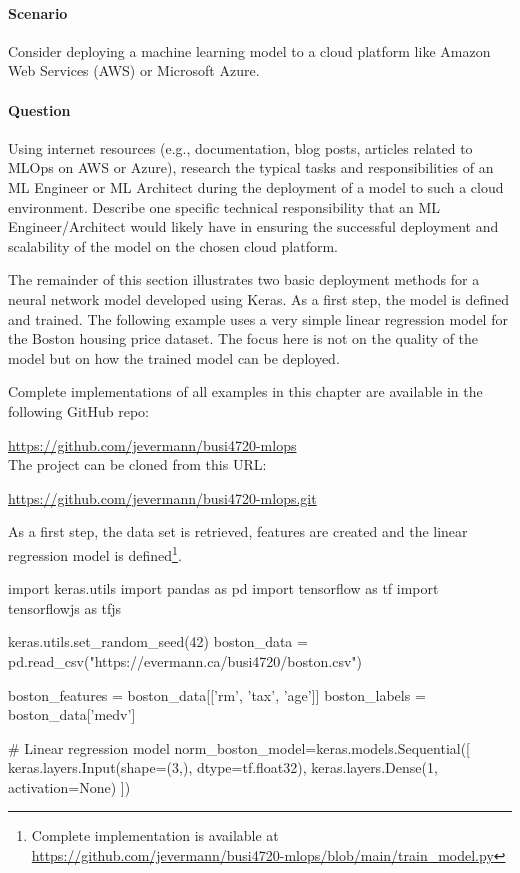 \begin{exercisebox}

\paragraph*{Scenario}
Consider deploying a machine learning model to a cloud platform like Amazon Web Services (AWS) or Microsoft Azure.

\paragraph*{Question}
Using internet resources (e.g., documentation, blog posts, articles related to MLOps on AWS or Azure), research the typical tasks and responsibilities of an ML Engineer or ML Architect during the deployment of a model to such a cloud environment. Describe one specific technical responsibility that an ML Engineer/Architect would likely have in ensuring the successful deployment and scalability of the model on the chosen cloud platform.
\end{exercisebox}


The remainder of this section illustrates two basic deployment methods for a neural network model developed using Keras. As a first step, the model is defined and trained. The following example uses a very simple linear regression model for the Boston housing price dataset. The focus here is not on the quality of the model but on how the trained model can be deployed. 

\begin{resourcebox}
Complete implementations of all examples in this chapter are available in the following GitHub repo:

\url{https://github.com/jevermann/busi4720-mlops} \\

The project can be cloned from this URL:

\url{https://github.com/jevermann/busi4720-mlops.git}
\end{resourcebox}

As a first step, the data set is retrieved, features are created and the linear regression model is defined\footnote{
Complete implementation is available at \url{https://github.com/jevermann/busi4720-mlops/blob/main/train_model.py}}. \\

\begin{pythoncode}
import keras.utils
import pandas as pd
import tensorflow as tf
import tensorflowjs as tfjs

keras.utils.set_random_seed(42)
boston_data = pd.read_csv("https://evermann.ca/busi4720/boston.csv")

boston_features = boston_data[['rm', 'tax', 'age']]
boston_labels = boston_data['medv']

# Linear regression model
norm_boston_model=keras.models.Sequential([
    keras.layers.Input(shape=(3,), dtype=tf.float32),
    keras.layers.Dense(1, activation=None) ])
\end{pythoncode}

